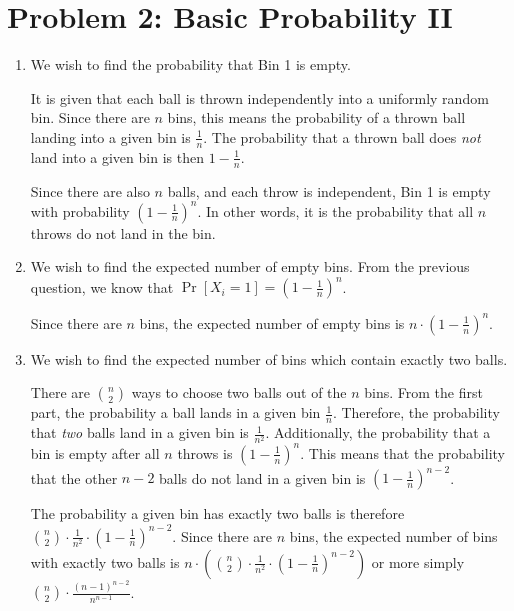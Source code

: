 \documentclass[12pt]{article}%
\begin{document}
\section*{Problem 2: Basic Probability II}
\begin{enumerate}[label=(\alph*)]
\item We wish to find the probability that Bin 1 is empty.

It is given that each ball is thrown independently into a uniformly random bin. Since there are $n$ bins, this means the probability of a thrown ball landing into a given bin is $\frac{1}{n}$. The probability that a thrown ball does \emph{not} land into a given bin is then $1 - \frac{1}{n}$.

Since there are also $n$ balls, and each throw is independent, Bin 1 is empty with probability $(1 - \frac{1}{n})^n$. In other words, it is the probability that all $n$ throws do not land in the bin.

\item We wish to find the expected number of empty bins. From the previous question, we know that $\Pr[X_i = 1] = (1 - \frac{1}{n})^n$.

Since there are $n$ bins, the expected number of empty bins is $n \cdot (1 - \frac{1}{n})^n$.

\item We wish to find the expected number of bins which contain exactly two balls.

There are $\binom{n}{2}$ ways to choose two balls out of the $n$ bins. From the first part, the probability a ball lands in a given bin $\frac{1}{n}$. Therefore, the probability that \emph{two} balls land in a given bin is $\frac{1}{n^2}$. Additionally, the probability that a bin is empty after all $n$ throws is $(1 - \frac{1}{n})^n$. This means that the probability that the other $n - 2$ balls do not land in a given bin is $(1 - \frac{1}{n})^{n - 2}$.

The probability a given bin has exactly two balls is therefore $\binom{n}{2} \cdot \frac{1}{n^2} \cdot (1 - \frac{1}{n})^{n - 2}$. Since there are $n$ bins, the expected number of bins with exactly two balls is $n \cdot (\binom{n}{2} \cdot \frac{1}{n^2} \cdot (1 - \frac{1}{n})^{n - 2})$ or more simply $\binom{n}{2} \cdot \frac{(n - 1)^{n - 2}}{n^{n - 1}}$.
\end{enumerate}
\end{document}
